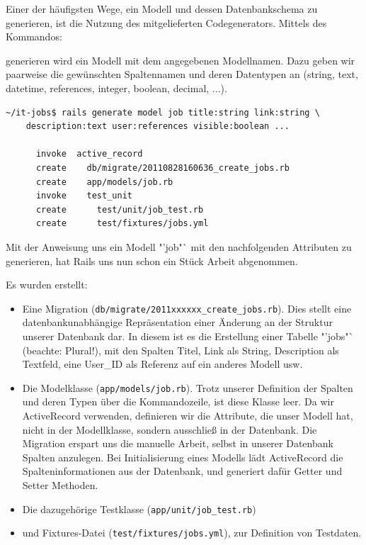 Einer der häufigsten Wege, ein Modell und dessen Datenbankschema zu generieren, ist die Nutzung des mitgelieferten Codegenerators. Mittels des Kommandos:


generieren wird ein Modell mit dem angegebenen Modellnamen. Dazu geben wir paarweise die gewünschten Spaltennamen und deren Datentypen an (string, text, datetime, references, integer, boolean, decimal, ...).
\begin{lstlisting}
~/it-jobs$ rails generate model job title:string link:string \
    description:text user:references visible:boolean ...

      invoke  active_record
      create    db/migrate/20110828160636_create_jobs.rb
      create    app/models/job.rb
      invoke    test_unit
      create      test/unit/job_test.rb
      create      test/fixtures/jobs.yml

\end{lstlisting}
Mit der Anweisung uns ein Modell "'job"` mit den nachfolgenden Attributen zu generieren, hat Rails uns nun schon ein Stück Arbeit abgenommen. 

Es wurden erstellt:
\begin{itemize}
 \item Eine Migration (\verb|db/migrate/2011xxxxxx_create_jobs.rb|). Dies stellt eine datenbankunabhängige Repräsentation einer Änderung an der Struktur unserer Datenbank dar. In diesem ist es die Erstellung einer Tabelle "'jobs"` (beachte: Plural!), mit den Spalten Titel, Link als String, Description als Textfeld, eine User\_ID als Referenz auf ein anderes Modell usw.
 \item Die Modelklasse (\verb|app/models/job.rb|). Trotz unserer Definition der Spalten und deren Typen über die Kommandozeile, ist diese Klasse leer. Da wir ActiveRecord verwenden, definieren wir die Attribute, die unser Modell hat, nicht in der Modellklasse, sondern ausschließ in der Datenbank. Die Migration erspart uns die manuelle Arbeit, selbst in unserer Datenbank Spalten anzulegen. Bei Initialisierung eines Modells lädt ActiveRecord die Spalteninformationen aus der Datenbank, und generiert dafür Getter und Setter Methoden. 
 \item Die dazugehörige Testklasse (\verb|app/unit/job_test.rb|)
 \item und Fixtures-Datei (\verb|test/fixtures/jobs.yml|), zur Definition von Testdaten. 
\end{itemize}

